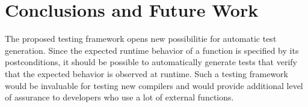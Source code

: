 \documentclass[runningheads]{llncs}
\begin{document}
\section{Conclusions and Future Work}
\label{sec:future}

The proposed testing framework opens new possibilitie for automatic test generation.
Since the expected runtime behavior of a function is specified by its postconditions, it should be possible to automatically generate tests that verify that the expected behavior is observed at runtime. 
Such a testing framework would be invaluable for testing new compilers and would provide additional level of assurance to developers who use a lot of external functions.

%
%
\end{document}

